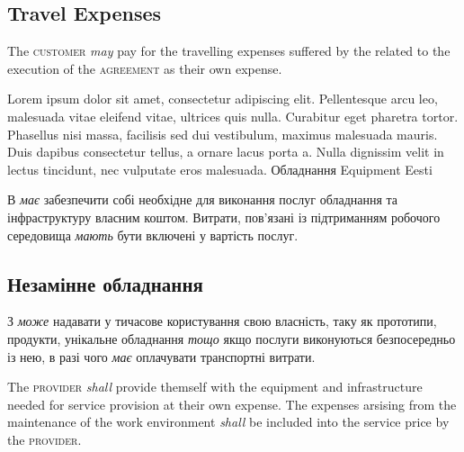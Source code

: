 \begin{Form}
\begin{paracol}{3}
{        \subsection{Travel Expenses}
        The \textsc{customer} \textit{may} pay for the travelling expenses suffered by the  related to the execution of the \textsc{agreement} as their own expense.
        }
        {Lorem ipsum dolor sit amet, consectetur adipiscing elit. Pellentesque arcu leo, malesuada vitae eleifend vitae, ultrices quis nulla. Curabitur eget pharetra tortor. Phasellus nisi massa, facilisis sed dui vestibulum, maximus malesuada mauris. Duis dapibus consectetur tellus, a ornare lacus porta a. Nulla dignissim velit in lectus tincidunt, nec vulputate eros malesuada. }
      \clause
        {Обладнання}
        {Equipment}
        {Eesti}
        {В \textit{має} забезпечити собі необхідне для виконання послуг обладнання та інфраструктуру власним коштом. Витрати, пов’язані із підтриманням робочого середовища \textit{мають} бути включені  у вартість послуг. 

        \subsection{Незамінне обладнання}
        З \textit{може} надавати  у тичасове користування свою власність, таку як прототипи, продукти, унікальне обладнання \textit{тощо} якщо послуги виконуються безпосередньо із нею, в разі чого  \textit{має} оплачувати транспортні витрати.}
        {The \textsc{provider} \textit{shall} provide themself with the equipment and infrastructure needed for service provision at their own expense. The expenses arsising from the maintenance of the work environment \textit{shall} be included into the service price by the \textsc{provider}. 

}
\end{paracol}
\end{Form}
